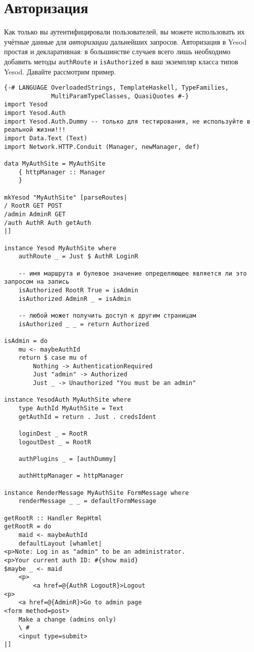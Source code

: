\section{Авторизация}

Как только вы аутентифицировали пользователей, вы можете использовать их учётные данные для \emph{авторизации} дальнейших запросов. Авторизация в Yesod простая и декларативная: в большинстве случаев всего лишь необходимо добавить методы \lstinline'authRoute' и \lstinline'isAuthorized' в ваш экземпляр класса типов Yesod. Давайте рассмотрим пример.

\begin{lstlisting}
{-# LANGUAGE OverloadedStrings, TemplateHaskell, TypeFamilies,
             MultiParamTypeClasses, QuasiQuotes #-}
import Yesod
import Yesod.Auth
import Yesod.Auth.Dummy -- только для тестирования, не используйте в реальной жизни!!!
import Data.Text (Text)
import Network.HTTP.Conduit (Manager, newManager, def)

data MyAuthSite = MyAuthSite
    { httpManager :: Manager
    }

mkYesod "MyAuthSite" [parseRoutes|
/ RootR GET POST
/admin AdminR GET
/auth AuthR Auth getAuth
|]

instance Yesod MyAuthSite where
    authRoute _ = Just $ AuthR LoginR

    -- имя маршрута и булевое значение определяющее является ли это запросом на запись
    isAuthorized RootR True = isAdmin
    isAuthorized AdminR _ = isAdmin

    -- любой может получить доступ к другим страницам
    isAuthorized _ _ = return Authorized

isAdmin = do
    mu <- maybeAuthId
    return $ case mu of
        Nothing -> AuthenticationRequired
        Just "admin" -> Authorized
        Just _ -> Unauthorized "You must be an admin"

instance YesodAuth MyAuthSite where
    type AuthId MyAuthSite = Text
    getAuthId = return . Just . credsIdent

    loginDest _ = RootR
    logoutDest _ = RootR

    authPlugins _ = [authDummy]

    authHttpManager = httpManager

instance RenderMessage MyAuthSite FormMessage where
    renderMessage _ _ = defaultFormMessage

getRootR :: Handler RepHtml
getRootR = do
    maid <- maybeAuthId
    defaultLayout [whamlet|
<p>Note: Log in as "admin" to be an administrator.
<p>Your current auth ID: #{show maid}
$maybe _ <- maid
    <p>
        <a href=@{AuthR LogoutR}>Logout
<p>
    <a href=@{AdminR}>Go to admin page
<form method=post>
    Make a change (admins only)
    \ #
    <input type=submit>
|]


\end{lstlisting}
